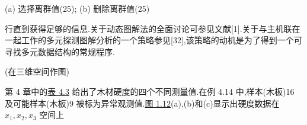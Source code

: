 
\begin{mvfigure}
\label{fig:1.10}
{ (a) 选择离群值(25); (b) 删除离群值(25)}
\end{mvfigure}

行直到获得足够的信息.关于动态图解法的全面讨论可参见文献[1].关于与主机联在一起工作的多元探测图解分析的一个策略参见[32],该策略的动机是为了得到一个可寻找多元数据结构的常规程序.

 (在三维空间作图)

第 4 章中的\hyperref[tab:4.3]{表 4.3} 给出了木材硬度的四个不同测量值.在例 4.14 中,样本(木板)16 及可能样本(木板)9 被标为异常观测值.\hyperref[fig:1.12]{图 1.12}(a),(b)和(c)显示出硬度数据在 $x_1,x_2,x_3$ 空间上%

